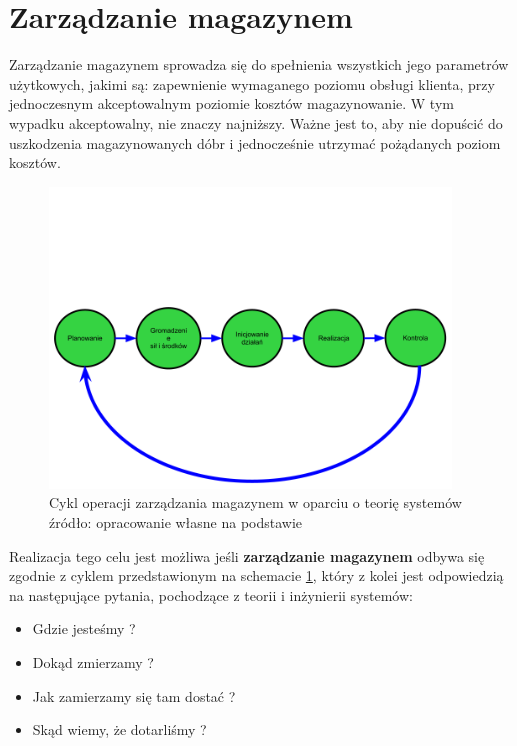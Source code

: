 \section{Zarządzanie magazynem}
	Zarządzanie magazynem sprowadza się do spełnienia wszystkich jego parametrów użytkowych, jakimi są:
	zapewnienie wymaganego poziomu obsługi klienta, przy jednoczesnym akceptowalnym poziomie kosztów magazynowanie.
	W tym wypadku akceptowalny, nie znaczy najniższy. Ważne jest to, aby nie dopuścić do uszkodzenia magazynowanych
	dóbr i jednocześnie utrzymać pożądanych poziom kosztów.
	\begin{figure}[h]
		\centering
		\includegraphics[width=0.95\textwidth]{images/warehouse_management_algorithm_2}
		\caption[Cykl operacji zarządzania magazynem]{
			Cykl operacji zarządzania magazynem w oparciu o teorię systemów \\
			źródło: opracowanie własne na podstawie \cite{PZMW}
		}
		\label{fig:warehouse_management_algorithm}
	\end{figure}
	Realizacja tego celu jest możliwa jeśli \textbf{zarządzanie magazynem} odbywa się zgodnie z cyklem
	przedstawionym na schemacie \ref{fig:warehouse_management_algorithm}, który z kolei jest odpowiedzią na
	następujące pytania, pochodzące z teorii i inżynierii systemów:
	\begin{itemize}
		\item Gdzie jesteśmy ?
		\item Dokąd zmierzamy ?
		\item Jak zamierzamy się tam dostać ?
		\item Skąd wiemy, że dotarliśmy ?
	\end{itemize}
	
